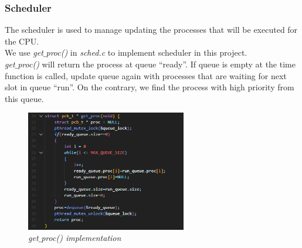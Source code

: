 \documentclass[13pt,a4paper]{article}
\begin{document}
			\subsubsection{Scheduler}
				The scheduler is used to manage updating the processes that will be executed for the CPU. \\
				We use \textit{get$\_$proc()} in \textit{sched.c} to implement scheduler in this project.\\
				\textit{get$\_$proc()} will return the process at queue ``ready''. If queue is empty at the time function is called, update queue again with processes that are waiting for next slot in queue ``run''. On the contrary, we find the process with high priority from this queue.
				\begin{figure}[h!]
				
	\begin{center}
				
		\includegraphics[width=7cm]{get_proc.png}
				
		\caption{\textit{get$\_$proc() implementation}}
				
	\end{center}
				\end{figure}
			\newpage
			
\end{document}
